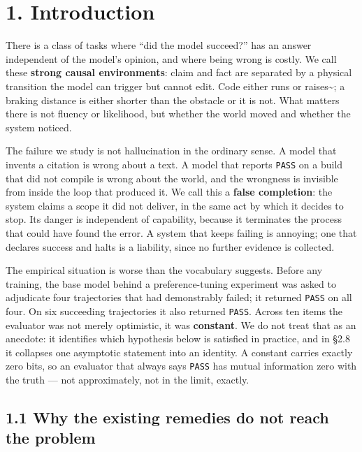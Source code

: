 \documentclass[11pt,a4paper]{article}
\begin{document}
\vspace{1.2em}

\section{1. Introduction}\label{introduction}

There is a class of tasks where ``did the model succeed?'' has an answer
independent of the model's opinion, and where being wrong is costly. We call
these \textbf{strong causal environments}: claim and fact are separated by a physical
transition the model can trigger but cannot edit. Code either runs or
raises\textasciitilde{}\cite{jimenez2023swebench}; a braking distance is either shorter than the
obstacle or it is not. What matters
there is not fluency or likelihood, but whether the world moved and whether the
system noticed.

The failure we study is not hallucination in the ordinary sense. A model that
invents a citation is wrong about a text. A model that reports \texttt{PASS} on a build
that did not compile is wrong about the world, and the wrongness is invisible
from inside the loop that produced it. We call this a \textbf{false completion}: the
system claims a scope it did not deliver, in the same act by which it decides to
stop. Its danger is independent of capability, because it terminates the process
that could have found the error. A system that keeps failing is annoying; one
that declares success and halts is a liability, since no further evidence is
collected.

The empirical situation is worse than the vocabulary suggests. Before any
training, the base model behind a preference-tuning experiment was asked to
adjudicate four trajectories that had demonstrably failed; it returned \texttt{PASS} on
all four. On six succeeding trajectories it also returned \texttt{PASS}. Across ten
items the evaluator was not merely optimistic, it was \textbf{constant}. We do not
treat that as an anecdote: it identifies which hypothesis below is satisfied in
practice, and in §2.8 it collapses one asymptotic statement into an identity. A
constant carries exactly zero bits, so an evaluator that always says \texttt{PASS} has
mutual information zero with the truth --- not approximately, not in the limit,
exactly.

\subsection{1.1 Why the existing remedies do not reach the problem}\label{why-the-existing-remedies-do-not-reach-the-problem}
\end{document}
